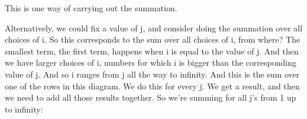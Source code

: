 \documentclass[pdftex, brazil, 12pt, twoside]{article}
\begin{document}
\begin{figure}[H]
  \begin{center}
  \end{center}
\end{figure}

This is one way of carrying out the summation.

Alternatively, we could fix a value of j, and consider doing
the summation over all choices of i.
So this corresponds to the sum over all
choices of i, from where?
The smallest term, the first term, happens when i is equal
to the value of j.
And then we have larger choices of i, numbers for
which i is bigger than the corresponding value of j.
And so i ranges from j all the way to infinity.
And this is the sum over one of the rows in this diagram.
We do this for every j.
We get a result, and then we need to add all
those results together.
So we're summing for all j's from 1 up to infinity:

\begin{figure}[H]
  \begin{center}
  \end{center}
\end{figure}
\end{document}
